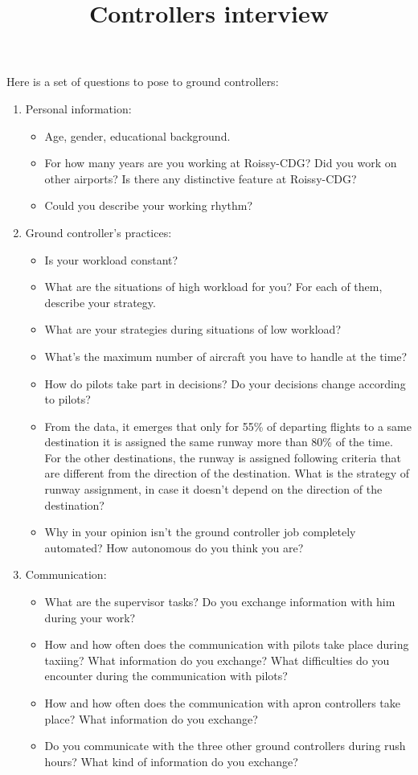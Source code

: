 \documentclass{article}
\begin{document}
		
	\title{Controllers interview}
	\maketitle
Here is a set of questions to pose to ground controllers:

\begin{enumerate}
    \item Personal information:
        \begin{itemize}
            \item Age, gender, educational background.
            \item For how many years are you working at Roissy-CDG? Did you work on other airports? Is there any distinctive feature at Roissy-CDG? 
            \item Could you describe your working rhythm?
        \end{itemize}
    \item Ground controller's practices:
        \begin{itemize}
            \item Is your workload constant? 
            \item What are the situations of high workload for you? For each of them, describe your strategy.
            \item What are your strategies during situations of low workload?
            \item What's the maximum number of aircraft you have to handle at the time?
            \item How do pilots take part in decisions? Do your decisions change according to pilots?
            \item From the data, it emerges that only for 55\% of departing flights to a same destination it is assigned the same runway more than 80\% of the time. For the other destinations, the runway is assigned following criteria that are different from the direction of the destination. What is the strategy of runway assignment, in case it doesn't depend on the direction of the destination?
            \item Why in your opinion isn't the ground controller job completely automated? How autonomous do you think you are?
        \end{itemize}
    \item Communication:
        \begin{itemize}
            \item What are the supervisor tasks? Do you exchange information with him during your work?
            \item How and how often does the communication with pilots take place during taxiing? What information do you exchange? What difficulties do you encounter during the communication with pilots? 
            \item How and how often does the communication with apron controllers take place? What information do you exchange?
            \item Do you communicate with the three other ground controllers during rush hours? What kind of information do you exchange?
        \end{itemize}
        

\end{enumerate}
\end{document}
